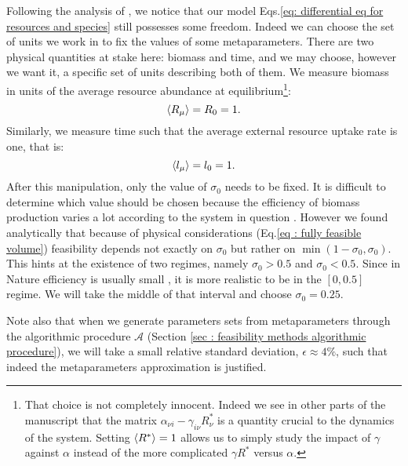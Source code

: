 \documentclass[12pt]{report}
\begin{document}
Following the analysis of \cite{barbier_cavity_2017}, we notice that our model Eqs.\eqref{eq: differential eq for resources and species} still possesses some freedom. Indeed we can choose the set of units we work in to fix the values of some metaparameters. There are two physical quantities at stake here: biomass and time, and we may choose, however we want it, a specific set of units describing both of them.
We measure biomass in units of the average resource abundance at equilibrium\footnote{That choice is not completely innocent. Indeed we see in other parts of the manuscript that the matrix $\alpha_{\nu i}-\gamma_{i \nu} R^*_\nu$ is a quantity crucial to the dynamics of the system. Setting $\langle R^* \rangle=1$ allows us to simply study the impact of $\gamma$ against $\alpha$ instead of the more complicated $\gamma R^*$ versus $\alpha$.}:
\begin{equation}
 \langle R_\mu \rangle = R_0 = 1.
\end{equation}
Similarly, we measure time such that the average external resource uptake rate is one, that is:
\begin{equation}
\langle l_\mu \rangle = l_0 = 1.
\end{equation}
After this manipulation, only the value of $\sigma_0$ needs to be fixed. It is difficult to determine which value should be chosen because the efficiency of biomass production varies a lot according to the system in question \cite{delong_shifts_2010}. However we found analytically that because of physical considerations (Eq.\ref{eq : fully feasible volume}) feasibility depends not exactly on $\sigma_0$ but rather on $\min(1-\sigma_0, \sigma_0)$. This hints at the existence of two regimes, namely $\sigma_0 > 0.5$ and $\sigma_0 < 0.5$. Since in Nature efficiency is usually small \cite{delong_shifts_2010}, it is more realistic to be in the $[0, 0.5]$ regime. We will take the middle of that interval and choose $\sigma_0=0.25$.

Note also that when we generate parameters sets from metaparameters through the algorithmic procedure $\mathcal{A}$ (Section \ref{sec : feasibility methods algorithmic procedure}), we will take a small relative standard deviation, $\epsilon \approx 4 \%$, such that indeed the metaparameters approximation is justified.
\end{document}
